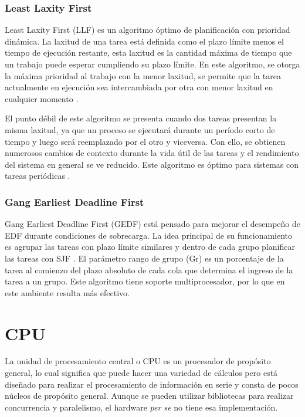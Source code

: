 \subsubsection{Least Laxity First}
Least Laxity First (LLF) es un algoritmo óptimo de planificación con prioridad dinámica. La laxitud de una tarea está definida como el plazo límite menos el tiempo de ejecución restante, esta laxitud es la cantidad máxima de tiempo que un trabajo puede esperar cumpliendo su plazo límite. En este algoritmo, se otorga la máxima prioridad al trabajo con la menor laxitud, se permite que la tarea actualmente en ejecución sea intercambiada por otra con menor laxitud en cualquier momento \cite{NPr}.
\newline
  
  El punto débil de este algoritmo se presenta cuando dos tareas presentan la misma laxitud, ya que un proceso se ejecutará durante un período corto de tiempo y luego será reemplazado por el otro y viceversa. Con ello, se obtienen numerosos cambios de contexto durante la vida útil de las tareas y el rendimiento del sistema en general se ve reducido. Este algoritmo es óptimo para sistemas con tareas periódicas \cite{ComRTT}.
  
\subsubsection{Gang Earliest Deadline First}
Gang Earliest Deadline First (GEDF) está pensado para mejorar el desempeño de EDF durante condiciones de sobrecarga\cite{GEDF}. La idea principal de su funcionamiento es agrupar las tareas con plazo límite similares y dentro de cada grupo planificar las tareas con SJF \cite{ComRTT}. 
El parámetro rango de grupo (Gr) es un porcentaje de la tarea al comienzo del plazo absoluto de cada cola que determina el ingreso de la tarea a un grupo. Este algoritmo tiene soporte multiprocesador, por lo que en este ambiente resulta más efectivo\cite{GEDF}.


        \section{CPU}
    La unidad de procesamiento central o CPU es un procesador de propósito general, lo cual significa que puede hacer una variedad de cálculos pero está diseñado para realizar el procesamiento de información en serie y consta de pocos núcleos de propósito general. Aunque se pueden utilizar bibliotecas para realizar concurrencia y paralelismo, el hardware \textit{per se} no tiene esa implementación.

